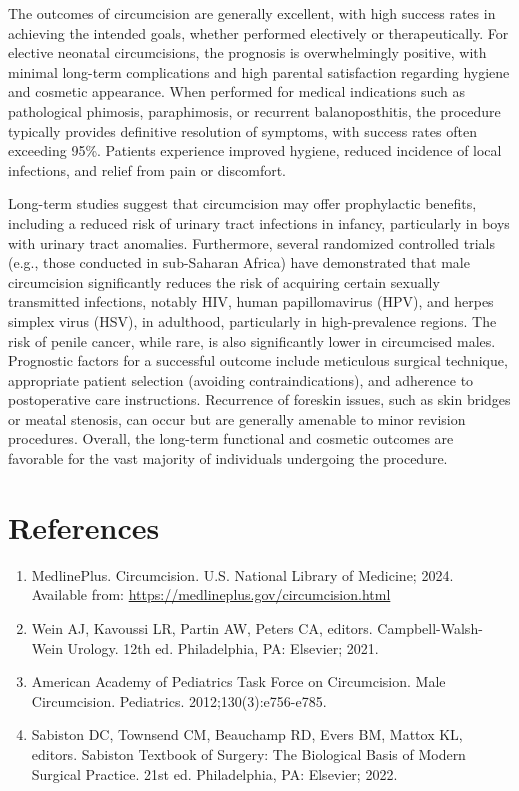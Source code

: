 The outcomes of circumcision are generally excellent, with high success rates in achieving the intended goals, whether performed electively or therapeutically. For elective neonatal circumcisions, the prognosis is overwhelmingly positive, with minimal long-term complications and high parental satisfaction regarding hygiene and cosmetic appearance. When performed for medical indications such as pathological phimosis, paraphimosis, or recurrent balanoposthitis, the procedure typically provides definitive resolution of symptoms, with success rates often exceeding 95\%. Patients experience improved hygiene, reduced incidence of local infections, and relief from pain or discomfort.

Long-term studies suggest that circumcision may offer prophylactic benefits, including a reduced risk of urinary tract infections in infancy, particularly in boys with urinary tract anomalies. Furthermore, several randomized controlled trials (e.g., those conducted in sub-Saharan Africa) have demonstrated that male circumcision significantly reduces the risk of acquiring certain sexually transmitted infections, notably HIV, human papillomavirus (HPV), and herpes simplex virus (HSV), in adulthood, particularly in high-prevalence regions. The risk of penile cancer, while rare, is also significantly lower in circumcised males. Prognostic factors for a successful outcome include meticulous surgical technique, appropriate patient selection (avoiding contraindications), and adherence to postoperative care instructions. Recurrence of foreskin issues, such as skin bridges or meatal stenosis, can occur but are generally amenable to minor revision procedures. Overall, the long-term functional and cosmetic outcomes are favorable for the vast majority of individuals undergoing the procedure.

\section*{References}
\begin{enumerate}
  \item MedlinePlus. Circumcision. U.S. National Library of Medicine; 2024. Available from: \url{https://medlineplus.gov/circumcision.html}
  \item Wein AJ, Kavoussi LR, Partin AW, Peters CA, editors. Campbell-Walsh-Wein Urology. 12th ed. Philadelphia, PA: Elsevier; 2021.
  \item American Academy of Pediatrics Task Force on Circumcision. Male Circumcision. Pediatrics. 2012;130(3):e756-e785.
  \item Sabiston DC, Townsend CM, Beauchamp RD, Evers BM, Mattox KL, editors. Sabiston Textbook of Surgery: The Biological Basis of Modern Surgical Practice. 21st ed. Philadelphia, PA: Elsevier; 2022.
\end{enumerate}

\clearpage
